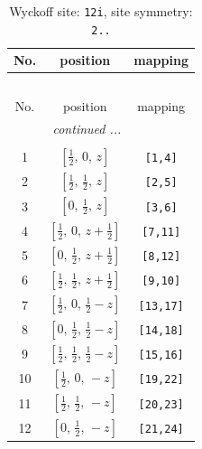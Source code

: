 \documentclass[fleqn,8pt]{jsarticle}
\begin{document}
\begin{longtable}{ccc}
\caption{Wyckoff site: {\tt 12i}, site symmetry: {\tt 2..}}
 \\
 \hline \hline
No. & position & mapping \\ \hline \endfirsthead

\multicolumn{2}{l}{\tablename\ \thetable{}} \\
 \hline \hline
No. & position & mapping \\ \hline \endhead

 \hline \hline
\multicolumn{2}{r}{\footnotesize\it continued ...} \\ \endfoot

 \hline \hline
\multicolumn{2}{r}{} \\ \endlastfoot

1 & $\left[ \frac{1}{2},\, 0,\, z \right]$ & {\tt [1,4]} \\ \hline
2 & $\left[ \frac{1}{2},\, \frac{1}{2},\, z \right]$ & {\tt [2,5]} \\ \hline
3 & $\left[ 0,\, \frac{1}{2},\, z \right]$ & {\tt [3,6]} \\ \hline
4 & $\left[ \frac{1}{2},\, 0,\, z + \frac{1}{2} \right]$ & {\tt [7,11]} \\ \hline
5 & $\left[ 0,\, \frac{1}{2},\, z + \frac{1}{2} \right]$ & {\tt [8,12]} \\ \hline
6 & $\left[ \frac{1}{2},\, \frac{1}{2},\, z + \frac{1}{2} \right]$ & {\tt [9,10]} \\ \hline
7 & $\left[ \frac{1}{2},\, 0,\, \frac{1}{2} - z \right]$ & {\tt [13,17]} \\ \hline
8 & $\left[ 0,\, \frac{1}{2},\, \frac{1}{2} - z \right]$ & {\tt [14,18]} \\ \hline
9 & $\left[ \frac{1}{2},\, \frac{1}{2},\, \frac{1}{2} - z \right]$ & {\tt [15,16]} \\ \hline
10 & $\left[ \frac{1}{2},\, 0,\, - z \right]$ & {\tt [19,22]} \\ \hline
11 & $\left[ \frac{1}{2},\, \frac{1}{2},\, - z \right]$ & {\tt [20,23]} \\ \hline
12 & $\left[ 0,\, \frac{1}{2},\, - z \right]$ & {\tt [21,24]} \\
\end{longtable}
\renewcommand{\arraystretch}{1.2}
\end{document}
